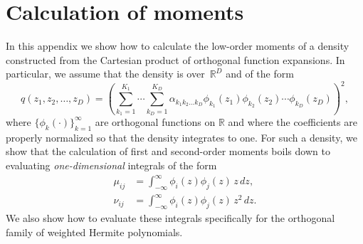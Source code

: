 
%

\section{Calculation of moments}
\label{app:moments}

In this appendix we show how to calculate the low-order moments of a density
constructed from the Cartesian product of orthogonal function expansions.
In particular, we assume that the density is over~$\mathbb{R}^D$ and of the form
\begin{equation}
    q(z_1,z_2,\ldots,z_D) = \left(\sum_{k_1=1}^{K_1} \cdots \sum_{k_D=1}^{K_D} \alpha_{k_1 k_2 \ldots k_D}\phi_{k_1}(z_1)\phi_{k_2}(z_2)\cdots\phi_{k_D}(z_D)\right)^2,
    \label{eq:joint}
\end{equation}
where $\{\phi_{k}(\cdot)\}_{k=1}^\infty$ are orthogonal functions on $\mathbb{R}$ and where the coefficients are properly normalized so that the density integrates to one. For such a density, we show that the calculation of first and second-order moments boils down to evaluating \textit{one-dimensional} integrals of the form
\begin{align}
\mu_{ij} &= \int_{-\infty}^\infty\! \phi_i(z)\phi_j(z)\, z\, dz,  \label{eq:momint1} \\
\nu_{ij} &= \int_{-\infty}^\infty\! \phi_i(z)\phi_j(z)\, z^2\, dz. \label{eq:momint2}
\end{align}
We also show how to evaluate these integrals specifically for the orthogonal family of weighted Hermite polynomials.

